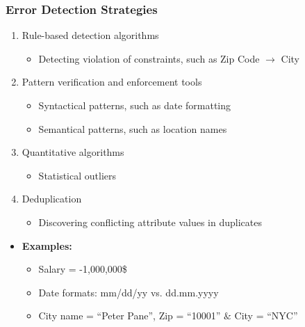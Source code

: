 \documentclass[aspectratio=169]{../latex_main/tntbeamer}  %
\begin{document}
\begin{frame}
\frametitle{Error Detection Strategies}

\begin{enumerate}
    \item Rule-based detection algorithms
    \begin{itemize}
        \item Detecting violation of constraints, such as Zip Code $\rightarrow$ City
    \end{itemize}
    \item Pattern verification and enforcement tools
    \begin{itemize}
        \item Syntactical patterns, such as date formatting
        \item Semantical patterns, such as location names
    \end{itemize}
    \item Quantitative algorithms
    \begin{itemize}
        \item Statistical outliers
    \end{itemize}
    \item Deduplication
    \begin{itemize}
        \item Discovering conflicting attribute values in duplicates
    \end{itemize}
\end{enumerate}

\begin{itemize}
    \item \textbf{Examples:} 
    \begin{itemize}
        \item Salary = -1,000,000\$
        \item Date formats: mm/dd/yy vs. dd.mm.yyyy
        \item City name = “Peter Pane”, Zip = “10001” $\&$ City = “NYC”
    \end{itemize}
\end{itemize}

\end{frame}
\end{document}
